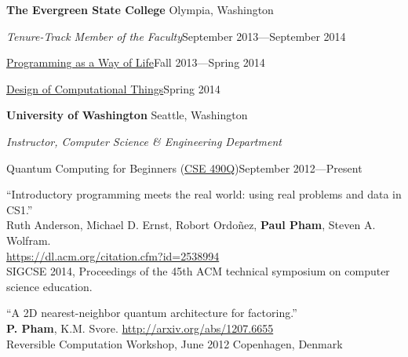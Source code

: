 \documentclass[letter]{article}
\begin{document}
\vspace{\baselineskip}
\par

{\bf The Evergreen State College} \hfill Olympia, Washington

\par
{\em Tenure-Track Member of the Faculty}\hfill September 2013---September 2014

\vspace{0.5\baselineskip}
\par
\href{http://ada.evergreen.edu/csf/python13f/}{Programming as a Way of Life}\hfill Fall 2013---Spring 2014
\vspace{0.5\baselineskip}
\par
\href{http://archives.evergreen.edu/catalogs/2013-14/programs/thedesignofcomputationalthings-12305/index.html}{Design of Computational Things}\hfill Spring 2014

\vspace{\baselineskip}
\par

{\bf University of Washington} \hfill Seattle, Washington

\par
{\em Instructor, Computer Science \& Engineering Department}

\vspace{0.5\baselineskip}
\par
Quantum Computing for Beginners (\href{http://www.cs.washington.edu/education/courses/490q/12au/}{CSE 490Q})\hfill September 2012---Present

\vspace{\baselineskip}
\par
``Introductory programming meets the real world: using real problems and data in CS1.''
\\
Ruth Anderson, Michael D. Ernst, Robort Ordo\~{n}ez, \textbf{Paul Pham}, Steven A. Wolfram.\\
\url{https://dl.acm.org/citation.cfm?id=2538994}\\
SIGCSE 2014, Proceedings of the 45th ACM technical symposium on computer science education.

\vspace{\baselineskip}
\par
``A 2D nearest-neighbor quantum architecture for factoring.''\\
\textbf{P. Pham}, K.M. Svore. \hfill \url{http://arxiv.org/abs/1207.6655}\\
Reversible Computation Workshop, June 2012 \hfill Copenhagen, Denmark
\end{document}

